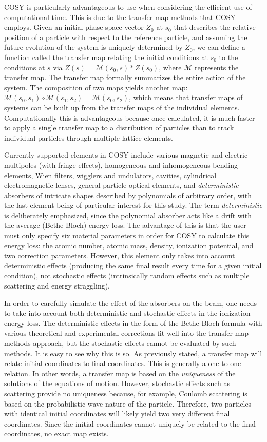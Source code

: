 \documentclass[a4paper,11pt]{article}
\begin{document}
COSY is particularly advantageous to use when considering the efficient use of computational time. This is due to the transfer map methods that COSY employs. Given an initial phase space vector $Z_0$ at $s_0$ that describes the relative position of a particle with respect to the reference particle, and assuming the future evolution of the system is uniquely determined by $Z_0$, we can define a function called the transfer map relating the initial conditions at $s_0$ to the conditions at $s$ via $Z(s)=\mathcal{M}(s_0,s)*Z(s_0)$, where $\mathcal{M}$ represents the transfer map. The transfer map formally summarizes the entire action of the system. The composition of two maps yields another map: $\mathcal{M}(s_0,s_1 )\circ\mathcal{M}(s_1,s_2 )=\mathcal{M}(s_0,s_2)$, which means that transfer maps of systems can be built up from the transfer maps of the individual elements. Computationally this is advantageous because once calculated, it is much faster to apply a single transfer map to a distribution of particles than to track individual particles through multiple lattice elements.

Currently supported elements in COSY include various magnetic and electric multipoles (with fringe effects), homogeneous and inhomogeneous bending elements, Wien filters, wigglers and undulators, cavities, cylindrical electromagnetic lenses, general particle optical elements, and \emph{deterministic} absorbers of intricate shapes described by polynomials of arbitrary order, with the last element being of particular interest for this study. The term \emph{deterministic} is deliberately emphasized, since the polynomial absorber acts like a drift with the average (Bethe-Bloch) energy loss. The advantage of this is that the user must only specify six material parameters in order for COSY to calculate this energy loss: the atomic number, atomic mass, density, ionization potential, and two correction parameters. However, this element only takes into account deterministic effects (producing the same final result every time for a given initial condition), not stochastic effects (intrinsically random effects such as multiple scattering and energy straggling).

In order to carefully simulate the effect of the absorbers on the beam, one needs to take into account both deterministic and stochastic effects in the ionization energy loss. The deterministic effects in the form of the Bethe-Bloch formula with various theoretical and experimental corrections fit well into the transfer map methods approach, but the stochastic effects cannot be evaluated by such methods. It is easy to see why this is so. As previously stated, a transfer map will relate initial coordinates to final coordinates. This is generally a one-to-one relation. In other words, a transfer map is based on the \textit{uniqueness} of the solutions of the equations of motion. However, stochastic effects such as scattering provide no uniqueness because, for example, Coulomb scattering is based on the probabilistic wave nature of the particle. Therefore, two particles with identical initial coordinates will likely yield two very different final coordinates. Since the initial coordinates cannot uniquely be related to the final coordinates, no exact map exists.
\end{document}
